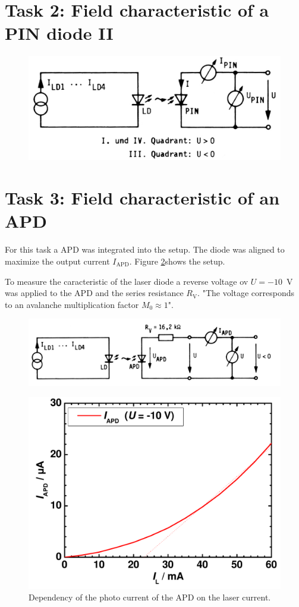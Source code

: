 \section{Task 2: Field characteristic of a PIN diode II}

\begin{figure}%
\centering
\includegraphics[width=.6\columnwidth]{Grafiken/T2_setup.jpg}%
\caption{}%
\label{fig:T3_setup}%
\end{figure}

\section{Task 3: Field characteristic of an APD}

For this task a APD was integrated into the setup. The diode was aligned to maximize the output current $I_{\mathrm{APD}}$.
Figure \ref{fig:T3_setup}\footnotemark[1] shows the setup.

To measure the caracteristic of the laser diode a reverse voltage ov $U = -10$~V was applied to the APD and the series resistance $R_{\mathrm{V}}$. "The voltage corresponds to an avalanche multiplication factor $M_0 \approx 1$"\footnotemark[1].

\begin{figure}%
\centering
\includegraphics[width=.85\columnwidth]{Grafiken/T3_setup.jpg}%
\caption{}%
\label{fig:T3_setup}%
\end{figure}


\begin{figure}%
\centering
\includegraphics[width=.5\columnwidth]{Grafiken/T3_laser.pdf}%
\caption{Dependency of the photo current of the APD on the laser current.}%
\label{fig:T3_laser}%
\end{figure}


